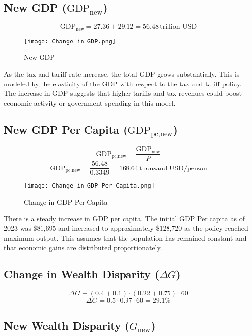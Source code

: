 \documentclass[12pt,letterpaper]{article}
\begin{document}
\subsection*{New GDP (\( \text{GDP}_{\text{new}} \))}

\[
\text{GDP}_{\text{new}} = 27.36 + 29.12 = 56.48 \, \text{trillion USD}
\]
\begin{figure} [ht]
    \centering
    \texttt{[image: Change in GDP.png]}
    \caption{New GDP}
    \label{fig:1}
\end{figure}

\indent As the tax and tariff rate increase, the total GDP grows substantially. This is modeled by the elasticity of the GDP with respect to the tax and tariff policy. The increase in GDP suggests that higher tariffs and tax revenues could boost economic activity or government spending in this model.

\subsection*{New GDP Per Capita (\( \text{GDP}_{\text{pc,new}} \))}
\[
\text{GDP}_{\text{pc,new}} = \frac{\text{GDP}_{\text{new}}}{P}
\]
\[
\text{GDP}_{\text{pc,new}} = \frac{56.48}{0.3349} = 168.64 \, \text{thousand USD/person}
\]

\begin{figure} [ht]
    \centering
    \texttt{[image: Change in GDP Per Capita.png]}
    \caption{Change in GDP Per Capita}
    \label{fig:2}
\end{figure}

\indent There is a steady increase in GDP per capita. The initial GDP Per capita as of 2023 was \$81,695 and increased to approximately \$128,720 as the policy reached maximum output. This assumes that the population has remained constant and that economic gains are distributed proportionately. 

\subsection*{Change in Wealth Disparity (\( \Delta G \))}
\[
\Delta G = (0.4 + 0.1) \cdot (0.22 + 0.75) \cdot 60
\]
\[
\Delta G = 0.5 \cdot 0.97 \cdot 60 = 29.1\%
\]

\subsection*{New Wealth Disparity (\( G_{\text{new}} \))}
\end{document}
